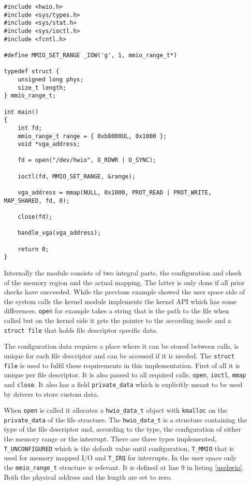 \documentclass[
a4paper,
12pt,
notitlepage,
parskip=half,
DIV=11,
]{scrbook}
\begin{document}
		\begin{lstlisting}[basicstyle=\ttfamily\footnotesize]
#include <hwio.h>
#include <sys/types.h>
#include <sys/stat.h>
#include <sys/ioctl.h>
#include <fcntl.h>

#define MMIO_SET_RANGE _IOW('g', 1, mmio_range_t*)

typedef struct {
	unsigned long phys;
	size_t length;
} mmio_range_t;

int main()
{
	int fd;
	mmio_range_t range = { 0xb8000UL, 0x1000 };
	void *vga_address;
	
	fd = open("/dev/hwio", O_RDWR | O_SYNC);
	
	ioctl(fd, MMIO_SET_RANGE, &range);
	
	vga_address = mmap(NULL, 0x1000, PROT_READ | PROT_WRITE, MAP_SHARED, fd, 0);
	
	close(fd);
	
	handle_vga(vga_address);
	
	return 0;
}
		\end{lstlisting}
		
		Internally the module consists of two integral parts, the configuration and check of the memory region and the actual mapping.
		The latter is only done if all prior checks have succeeded.
		While the previous example showed the user space side of the system calls the kernel module implements the kernel API which has some differences.
		\texttt{open} for example takes a string that is the path to the file when called but on the kernel side it gets the pointer to the according inode and a \texttt{struct file} that holds file descriptor specific data.
		
		The configuration data requires a place where it can be stored between calls, is unique for each file descriptor and can be accessed if it is needed.
		The \texttt{struct file} is used to fulfil these requirements in this implementation.
		First of all it is unique per file descriptor.
		It is also passed to all required calls, \texttt{open}, \texttt{ioctl}, \texttt{mmap} and \texttt{close}.
		It also has a field \texttt{private\_data} which is explicitly meant to be used by drivers to store custom data.
		
		When \texttt{open} is called it allocates a \texttt{hwio\_data\_t} object with \texttt{kmalloc} on the \texttt{private\_data} of the file structure.
		The \texttt{hwio\_data\_t} is a structure containing the type of the file descriptor and, according to the type, the configuration of either the memory range or the interrupt.
		There are three types implemented, \texttt{T\_UNCONFIGURED} which is the default value until configuration, \texttt{T\_MMIO} that is used for memory mapped I/O and \texttt{T\_IRQ} for interrupts.
		In the user space only the \texttt{mmio\_range\_t} structure is relevant.
		It is defined at line 9 in listing \ref{usehwio}.
		Both the physical address and the length are set to zero.
		
\end{document}
